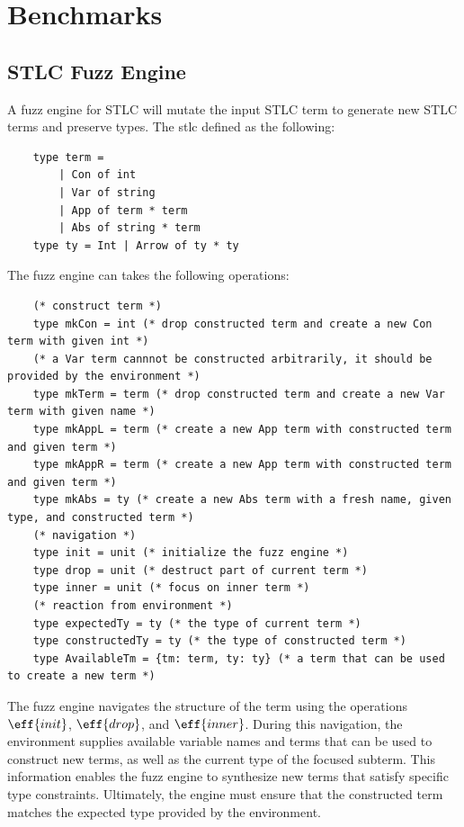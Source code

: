 \section{Benchmarks}

\subsection{STLC Fuzz Engine}

A fuzz engine for STLC will mutate the input STLC term to generate new STLC terms and preserve types. The stlc defined as the following:
\begin{verbatim}
    type term =
        | Con of int 
        | Var of string
        | App of term * term
        | Abs of string * term
    type ty = Int | Arrow of ty * ty
\end{verbatim}

The fuzz engine can takes the following operations:
\begin{verbatim}
    (* construct term *)
    type mkCon = int (* drop constructed term and create a new Con term with given int *)
    (* a Var term cannnot be constructed arbitrarily, it should be provided by the environment *)
    type mkTerm = term (* drop constructed term and create a new Var term with given name *)
    type mkAppL = term (* create a new App term with constructed term and given term *)
    type mkAppR = term (* create a new App term with constructed term and given term *)
    type mkAbs = ty (* create a new Abs term with a fresh name, given type, and constructed term *)
    (* navigation *)
    type init = unit (* initialize the fuzz engine *)
    type drop = unit (* destruct part of current term *)
    type inner = unit (* focus on inner term *)
    (* reaction from environment *)
    type expectedTy = ty (* the type of current term *)
    type constructedTy = ty (* the type of constructed term *)
    type AvailableTm = {tm: term, ty: ty} (* a term that can be used to create a new term *)
\end{verbatim}

The fuzz engine navigates the structure of the term using the operations $\eff{init}$, $\eff{drop}$, and $\eff{inner}$. During this navigation, the environment supplies available variable names and terms that can be used to construct new terms, as well as the current type of the focused subterm. This information enables the fuzz engine to synthesize new terms that satisfy specific type constraints. Ultimately, the engine must ensure that the constructed term matches the expected type provided by the environment.

